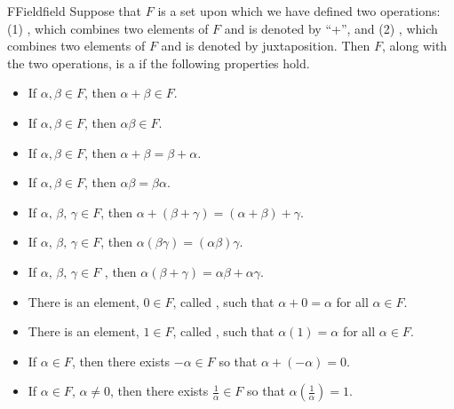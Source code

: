\begin{definition}{F}{Field}{field}
%
Suppose that $F$ is a set upon which we have defined two operations: (1) , which combines two elements of $F$ and is denoted by ``+'', and (2) , which combines two elements of $F$ and is denoted by juxtaposition.   Then $F$, along with the two operations, is a  if the following properties hold.
%
\begin{itemize}
%
\item{}
If $\alpha,\beta\in F$, then $\alpha+\beta\in F$.
%
\item{}
If $\alpha,\beta\in F$, then $\alpha\beta\in F$.
%
\item{}
If $\alpha,\beta\in F$, then $\alpha+\beta=\beta+\alpha$.
%
\item{}
If $\alpha,\beta\in F$, then $\alpha\beta=\beta\alpha$.
%
\item{}
If $\alpha,\,\beta,\,\gamma\in F$, then $\alpha+\left(\beta+\gamma\right)=\left(\alpha+\beta\right)+\gamma$.
%
\item{}
If $\alpha,\,\beta,\,\gamma\in F$, then $\alpha\left(\beta\gamma\right)=\left(\alpha\beta\right)\gamma$.
%
\item{}
If $\alpha,\,\beta,\,\gamma\in F$ , then $\alpha(\beta+\gamma)=\alpha\beta+\alpha\gamma$.
%
\item{}
There is an element, $0\in F$, called , such that  $\alpha+0=\alpha$  for all $\alpha\in F$.
%
\item{}
There is an element, $1\in F$, called , such that  $\alpha(1)=\alpha$  for all $\alpha\in F$.
%
\item{}
If $\alpha\in F$, then there exists $-\alpha\in F$ so that $\alpha+ (-\alpha)=0$.
%
\item{}
If $\alpha\in F$, $\alpha\neq 0$, then there exists $\frac{1}{\alpha}\in F$ so that $\alpha\left(\frac{1}{\alpha}\right)=1$.
%
\end{itemize}
%
\end{definition}
